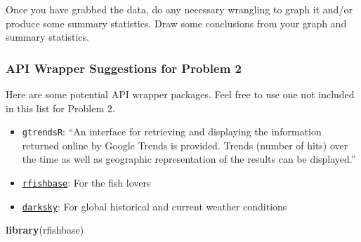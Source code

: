 \documentclass[
]{article}
\newenvironment{Shaded}{\begin{snugshade}}{\end{snugshade}}
\newcommand{\FunctionTok}[1]{\textcolor[rgb]{0.13,0.29,0.53}{\textbf{#1}}}
\newcommand{\NormalTok}[1]{#1}
\providecommand{\tightlist}{%
  \setlength{\itemsep}{0pt}\setlength{\parskip}{0pt}}
\begin{document}
Once you have grabbed the data, do any necessary wrangling to graph it
and/or produce some summary statistics. Draw some conclusions from your
graph and summary statistics.

\hypertarget{api-wrapper-suggestions-for-problem-2}{%
\subsubsection{API Wrapper Suggestions for Problem
2}\label{api-wrapper-suggestions-for-problem-2}}

Here are some potential API wrapper packages. Feel free to use one not
included in this list for Problem 2.

\begin{itemize}
\tightlist
\item
  \texttt{gtrendsR}: ``An interface for retrieving and displaying the
  information returned online by Google Trends is provided. Trends
  (number of hits) over the time as well as geographic representation of
  the results can be displayed.''
\item
  \href{https://github.com/ropensci/rfishbase}{\texttt{rfishbase}}: For
  the fish lovers
\item
  \href{https://github.com/hrbrmstr/darksky}{\texttt{darksky}}: For
  global historical and current weather conditions
\end{itemize}

\begin{Shaded}
\begin{Highlighting}[]
\FunctionTok{library}\NormalTok{(rfishbase)}
\end{Highlighting}
\end{Shaded}
\end{document}
